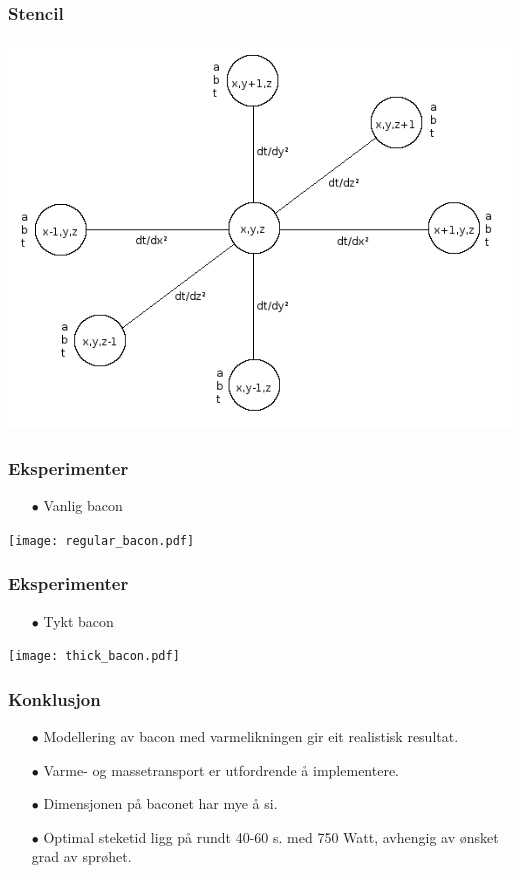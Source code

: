 \documentclass[screen]{beamer}
\begin{document}
\begin{frame}
  \frametitle{Stencil}
    \hspace{40pt}
      \includegraphics[width=0.7\linewidth]{stencil.png}
\end{frame}

\begin{frame}
  \frametitle{Eksperimenter}
   \begin{itemize} 
  	\item[$\bullet$] Vanlig bacon
  \end{itemize}
  \hspace{40pt}
      \texttt{[image: regular\_bacon.pdf]}
    
\end{frame}

\begin{frame}
  \frametitle{Eksperimenter}
  \begin{itemize} 
  	\item[$\bullet$] Tykt bacon
  \end{itemize}
     \hspace{40pt}
      \texttt{[image: thick\_bacon.pdf]}
\end{frame}

\begin{frame}
  \frametitle{Konklusjon}
  \begin{itemize} 
  	\item[$\bullet$] Modellering av bacon med varmelikningen gir eit realistisk resultat.
  	\item[$\bullet$] Varme- og massetransport er utfordrende å implementere.
  	\item[$\bullet$] Dimensjonen på baconet har mye å si.	
  	\item[$\bullet$] Optimal steketid ligg på rundt 40-60 s. med 750 Watt, avhengig av ønsket grad av sprøhet.
  	\end{itemize}
\end{frame}
\end{document}
